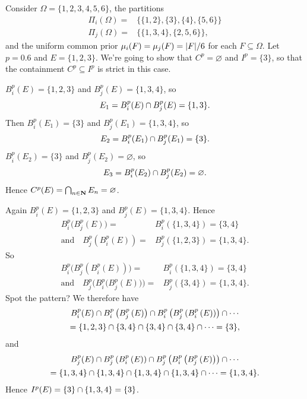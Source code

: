\documentclass[11pt,letterpaper,reqno,oneside]{article}
\begin{document}
\begin{example}
	Consider $\Omega = \{1,2,3,4,5,6\}$, the partitions
	\begin{align*}
		\Pi_i(\Omega) ={}& \{ \{1,2\}, \{3\}, \{4\}, \{5,6\} \}
		\\
		\Pi_j(\Omega) ={}& \{ \{ 1,3,4 \}, \{ 2,5,6 \} \} ,
	\end{align*}
	and the uniform common prior $\mu_i(F) = \mu_j(F) = \abs*{F}/6$ for each $F \subseteq \Omega$. Let $p=0.6$ and $E = \{1,2,3\}$. We're going to show that $C^p=\varnothing$ and $I^p=\{3\}$, so that the containment $C^p \subseteq I^p$ is strict in this case.

	$B^p_i(E) = \{1,2,3\}$ and $B^p_j(E) = \{1,3,4\}$, so
	\begin{equation*}
		E_1 = B^p_i(E) \cap B^p_j(E) = \{1,3\} .
	\end{equation*}
	Then $B^p_i(E_1) = \{3\}$ and $B^p_j(E_1) = \{1,3,4\}$, so
	\begin{equation*}
		E_2 = B^p_i(E_1) \cap B^p_j(E_1) = \{3\} .
	\end{equation*}
	$B^p_i(E_2) = \{3\}$ and $B^p_j(E_2) = \varnothing$, so
	\begin{equation*}
		E_3 = B^p_i(E_2) \cap B^p_j(E_2) = \varnothing .
	\end{equation*}
	Hence $C^p(E) = \bigcap_{n \in \mathbf{N}} E_n = \varnothing$.

	Again $B^p_i(E) = \{1,2,3\}$ and $B^p_j(E) = \{1,3,4\}$. Hence
	\begin{align*}
		B^p_i \bigl( B^p_j(E) \bigr) ={}& B^p_i( \{1,3,4\} ) = \{3,4\}
		\\\text{and}\quad
		B^p_j ( B^p_i(E) ) ={}& B^p_j( \{1,2,3\} ) = \{1,3,4\} .
	\end{align*}
	So
	\begin{align*}
		B^p_i \bigl( B^p_j ( B^p_i(E) ) \bigr) ={}& B^p_i( \{1,3,4\} ) = \{3,4\}
		\\\text{and}\quad
		B^p_j \bigl( B^p_i \bigl( B^p_j(E) \bigr) \bigr) ={}& B^p_j( \{3,4\} ) = \{1,3,4\} .
	\end{align*}
	Spot the pattern? We therefore have
	\begin{multline*}
		B^p_i(E) 
		\cap B^p_i \left( B^p_j \left( E \right) \right)
		\cap B^p_i \left( B^p_j \left( B^p_i \left( E \right) \right) \right) 
		\cap \cdots 
		\\
		= \{1,2,3\} 
		\cap \{3,4\}
		\cap \{3,4\}
		\cap \{3,4\} 
		\cap \cdots 
		= \{3\} ,
	\end{multline*}
	and
	\begin{multline*}
		B^p_j(E) 
		\cap B^p_j \left( B^p_i \left( E \right) \right)
		\cap B^p_j \left( B^p_i \left( B^p_j \left( E \right) \right) \right) 
		\cap \cdots 
		\\
		= \{1,3,4\}
		\cap \{1,3,4\}
		\cap \{1,3,4\}
		\cap \{1,3,4\}
		\cap \cdots 
		= \{1,3,4\} .
	\end{multline*}
	Hence $I^p(E) = \{3\} \cap \{1,3,4\} = \{3\}$.
\end{example}
\end{document}
